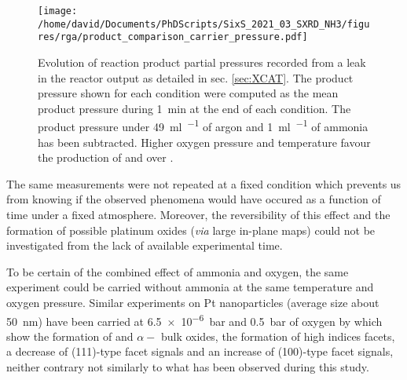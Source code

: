 \begin{figure}[!htb]
    \centering
    \texttt{[image: /home/david/Documents/PhDScripts/SixS\_2021\_03\_SXRD\_NH3/figures/rga/product\_comparison\_carrier\_pressure.pdf]}
    \caption{
        Evolution of reaction product partial pressures  recorded from a leak in the reactor output as detailed in sec. \ref{sec:XCAT}.
        The product pressure shown for each condition were computed as the mean product pressure during \qty{1}{\minute} at the end of each condition.
        The product pressure under \qty{49}{\ml\per\min} of argon and \qty{1}{\ml\per\min} of ammonia has been subtracted.
        Higher oxygen pressure and temperature favour the production of \nitrousoxide and \nitricoxide over \nitrogen.
    }
    \label{fig:RGASXRDNanoparticlesComparison}
\end{figure}

The same measurements were not repeated at a fixed condition which prevents us from knowing if the observed phenomena would have occured as a function of time under a fixed atmosphere.
Moreover, the reversibility of this effect and the formation of possible platinum oxides (\textit{via} large in-plane maps) could not be investigated from the lack of available experimental time.

To be certain of the combined effect of ammonia and oxygen, the same experiment could be carried without ammonia at the same temperature and oxygen pressure.
Similar experiments on Pt nanoparticles (average size about \qty{50}{\nm}) have been carried at \qty{6.5e-6}{\bar} and \qty{0.5}{\bar} of oxygen by \cite{Hejral2013} which show the formation of  and $\alpha-$ bulk oxides, the formation of high indices facets, a decrease of (111)-type facet signals and an increase of (100)-type facet signals, neither contrary not similarly to what has been observed during this study.
